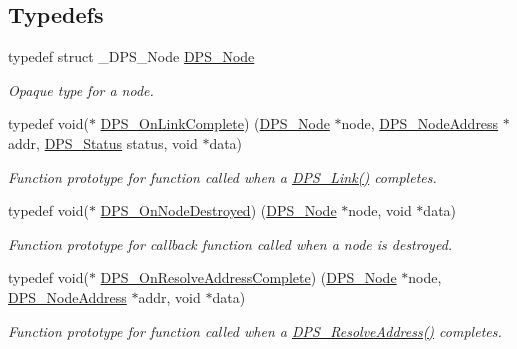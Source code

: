 \subsection*{Typedefs}
\begin{DoxyCompactItemize}
\item 
\mbox{\label{group__node_ga4dd612ab965134321bb57fdb065f121c}} 
typedef struct \+\_\+\+D\+P\+S\+\_\+\+Node \hyperlink{group__node_ga4dd612ab965134321bb57fdb065f121c}{D\+P\+S\+\_\+\+Node}
\begin{DoxyCompactList}\small\item\em Opaque type for a node. \end{DoxyCompactList}\item 
typedef void($\ast$ \hyperlink{group__node_gaaf70ac42acab8a67693947871e97600f}{D\+P\+S\+\_\+\+On\+Link\+Complete}) (\hyperlink{group__node_ga4dd612ab965134321bb57fdb065f121c}{D\+P\+S\+\_\+\+Node} $\ast$node, \hyperlink{group__nodeaddress_ga9e9f56aa38e82b4edcef7eb81e9f5bd2}{D\+P\+S\+\_\+\+Node\+Address} $\ast$addr, \hyperlink{group__status_ga30395a84d3cad9d4ec29848106415038}{D\+P\+S\+\_\+\+Status} status, void $\ast$data)
\begin{DoxyCompactList}\small\item\em Function prototype for function called when a \hyperlink{group__node_ga5064c63b8ce76bf34402e0c80183234b}{D\+P\+S\+\_\+\+Link()} completes. \end{DoxyCompactList}\item 
typedef void($\ast$ \hyperlink{group__node_ga1e88cc9ca744782e36d58a022fe026c5}{D\+P\+S\+\_\+\+On\+Node\+Destroyed}) (\hyperlink{group__node_ga4dd612ab965134321bb57fdb065f121c}{D\+P\+S\+\_\+\+Node} $\ast$node, void $\ast$data)
\begin{DoxyCompactList}\small\item\em Function prototype for callback function called when a node is destroyed. \end{DoxyCompactList}\item 
typedef void($\ast$ \hyperlink{group__node_gac1c96ed1ff9a92e7421ae1c428acb904}{D\+P\+S\+\_\+\+On\+Resolve\+Address\+Complete}) (\hyperlink{group__node_ga4dd612ab965134321bb57fdb065f121c}{D\+P\+S\+\_\+\+Node} $\ast$node, \hyperlink{group__nodeaddress_ga9e9f56aa38e82b4edcef7eb81e9f5bd2}{D\+P\+S\+\_\+\+Node\+Address} $\ast$addr, void $\ast$data)
\begin{DoxyCompactList}\small\item\em Function prototype for function called when a \hyperlink{group__node_gab78df7f4498b847ddb32fdd33d39ef0f}{D\+P\+S\+\_\+\+Resolve\+Address()} completes. \end{DoxyCompactList}\item 

\end{DoxyCompactItemize}
